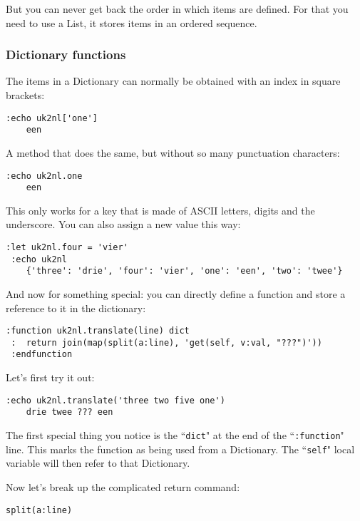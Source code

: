 But you can never get back the order in which items are defined.
For that you need to use a List, it stores items in an ordered sequence.
\subsubsection{Dictionary functions}
The items in a Dictionary can normally be obtained with an index in square brackets:

\begin{Verbatim}[samepage=true]
 :echo uk2nl['one']
    een
\end{Verbatim}

A method that does the same, but without so many punctuation characters:

\begin{Verbatim}[samepage=true]
 :echo uk2nl.one
    een
\end{Verbatim}

This only works for a key that is made of ASCII letters, digits and the underscore.
You can also assign a new value this way:

\begin{Verbatim}[samepage=true]
 :let uk2nl.four = 'vier'
 :echo uk2nl
    {'three': 'drie', 'four': 'vier', 'one': 'een', 'two': 'twee'}
\end{Verbatim}

And now for something special: you can directly define a function and store a reference to it in the dictionary:

\begin{Verbatim}[samepage=true]
 :function uk2nl.translate(line) dict
 :  return join(map(split(a:line), 'get(self, v:val, "???")'))
 :endfunction
\end{Verbatim}

Let's first try it out:

\begin{Verbatim}[samepage=true]
 :echo uk2nl.translate('three two five one')
    drie twee ??? een
\end{Verbatim}

The first special thing you notice is the ``\texttt{dict}" at the end of the ``\texttt{:function}" line.
This marks the function as being used from a Dictionary.
The ``\texttt{self}" local variable will then refer to that Dictionary.

Now let's break up the complicated return command:

\begin{Verbatim}[samepage=true]
 split(a:line)
\end{Verbatim}

